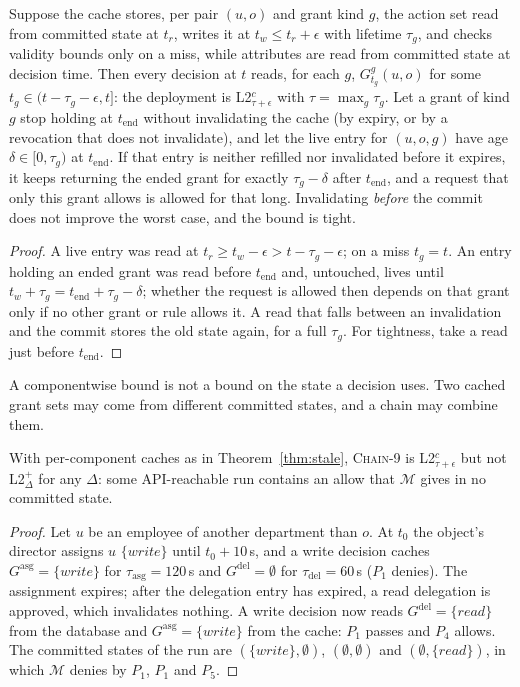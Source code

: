 \documentclass[sigconf,review,anonymous]{acmart}
\newcommand{\chain}{\textsc{Chain-9}\xspace}
\newcommand{\Gasg}{G^{\mathrm{asg}}}
\newcommand{\Gdel}{G^{\mathrm{del}}}
\begin{document}
\begin{theorem}\label{thm:stale}
Suppose the cache stores, per pair $(u,o)$ and grant kind $g$, the action set read from committed state at $t_r$,
writes it at $t_w\le t_r+\epsilon$ with lifetime $\tau_g$, and checks validity bounds only on a miss, while
attributes are read from committed state at decision time. Then every decision at $t$ reads, for each $g$,
$G^g_{t_g}(u,o)$ for some $t_g\in(t-\tau_g-\epsilon,t]$: the deployment is L2$^c_{\tau+\epsilon}$ with
$\tau=\max_g\tau_g$. Let a grant of kind $g$ stop holding at $t_{\mathrm{end}}$ without invalidating the cache (by
expiry, or by a revocation that does not invalidate), and let the live entry for $(u,o,g)$ have age
$\delta\in[0,\tau_g)$ at $t_{\mathrm{end}}$. If that entry is neither refilled nor invalidated before it expires,
it keeps returning the ended grant for exactly $\tau_g-\delta$ after $t_{\mathrm{end}}$, and a request that only
this grant allows is allowed for that long. Invalidating \emph{before} the commit does not improve the worst case,
and the bound is tight.
\end{theorem}
\begin{proof}
A live entry was read at $t_r\ge t_w-\epsilon>t-\tau_g-\epsilon$; on a miss $t_g=t$. An entry holding an ended grant
was read before $t_{\mathrm{end}}$ and, untouched, lives until $t_w+\tau_g=t_{\mathrm{end}}+\tau_g-\delta$; whether
the request is allowed then depends on that grant only if no other grant or rule allows it. A read that falls
between an invalidation and the commit stores the old state again, for a full $\tau_g$. For tightness, take a
read just before $t_{\mathrm{end}}$.
\end{proof}

A componentwise bound is not a bound on the state a decision uses. Two cached grant sets may come from
different committed states, and a chain may combine them.

\begin{proposition}\label{prop:mixed}
With per-component caches as in Theorem~\ref{thm:stale}, \chain is L2$^c_{\tau+\epsilon}$ but not L2$^+_\Delta$
for any $\Delta$: some API-reachable run contains an allow that $\mathcal{M}$ gives in no committed state.
\end{proposition}
\begin{proof}
Let $u$ be an employee of another department than $o$. At $t_0$ the object's director assigns $u$
$\{\mathit{write}\}$ until $t_0+10$\,s, and a write decision caches $\Gasg=\{\mathit{write}\}$ for $\tau_{\mathrm{asg}}=120$\,s
and $\Gdel=\emptyset$ for $\tau_{\mathrm{del}}=60$\,s ($P_1$ denies). The assignment expires; after the
delegation entry has expired, a read delegation is approved, which invalidates nothing. A write decision now reads
$\Gdel=\{\mathit{read}\}$ from the database and $\Gasg=\{\mathit{write}\}$ from the cache: $P_1$ passes and $P_4$
allows. The committed states of the run are $(\{\mathit{write}\},\emptyset)$, $(\emptyset,\emptyset)$ and
$(\emptyset,\{\mathit{read}\})$, in which $\mathcal{M}$ denies by $P_1$, $P_1$ and $P_5$.
\end{proof}
\end{document}
